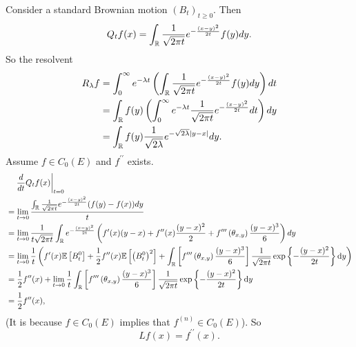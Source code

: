 \begin{exam}
    Consider a standard Brownian motion $(B_t)_{t \geq 0}$. Then
    \begin{equation*}
        Q_tf(x) = \int_{\mathbb{R}} \frac{1}{\sqrt{2\pi t}}e^{-\frac{(x-y)^2}{2t}}f(y)dy.
    \end{equation*}
    So the resolvent
    \begin{align*}
        R_\lambda f &= \int_0^\infty e^{-\lambda t} \left( \int_{\mathbb{R}} \frac{1}{\sqrt{2\pi t}}e^{-\frac{(x-y)^2}{2t}}f(y)dy \right)dt \\
        &= \int_{\mathbb{R}} f(y)\left(\int_0^\infty e^{-\lambda t} \frac{1}{\sqrt{2\pi t}}e^{-\frac{(x-y)^2}{2t}} dt \right) dy \\
        &= \int_{\mathbb{R}} f(y) \frac{1}{\sqrt{2 \lambda}} e^{-\sqrt{2\lambda} \left\lvert y-x\right\lvert} dy.
    \end{align*}
    Assume $f \in C_0(E)$ and $f^{\prime \prime}$ exists.
    \begin{align*}
        &\quad\left.\frac{d}{dt}Q_tf(x)\right\lvert_{t = 0} \\
        &= \lim_{t \rightarrow 0} \frac{ \int_{\mathbb{R}} \frac{1}{\sqrt{2\pi t}}e^{-\frac{(x-y)^2}{2t}}(f(y) - f(x))dy }{t} \\
        &= \lim_{t \rightarrow 0} \frac{1}{t\sqrt{2\pi t}}\int_{\mathbb{R}} e^{-\frac{(x-y)^2}{2t}}\left(f^{\prime}(x)(y-x)+f^{\prime \prime}(x) \frac{(y-x)^2}{2}+f^{\prime \prime \prime}\left(\theta_{x, y}\right) \frac{(y-x)^3}{6}\right)dy \\
        &= \lim_{t \rightarrow 0}\frac{1}{t}\left(f^{\prime}(x) \mathbb{E}\left[B_t^0\right]+\frac{1}{2} f^{\prime \prime}(x) \mathbb{E}\left[\left(B_t^0\right)^2\right]+\int_{\mathbb{R}}\left[f^{\prime \prime \prime}\left(\theta_{x, y}\right) \frac{(y-x)^3}{6}\right] \frac{1}{\sqrt{2 \pi t}} \exp \left\{-\frac{(y-x)^2}{2 t}\right\} \mathrm{d} y \right)\\
        &= \frac{1}{2} f^{\prime \prime}(x)+\lim_{t\rightarrow 0} \frac{1}{t}\int_{\mathbb{R}}\left[f^{\prime \prime \prime}\left(\theta_{x, y}\right) \frac{(y-x)^3}{6}\right] \frac{1}{\sqrt{2 \pi t}} \exp \left\{-\frac{(y-x)^2}{2 t}\right\} \mathrm{d} y \\
        &= \frac{1}{2} f^{\prime \prime}(x),
    \end{align*}
    (It is because $f \in C_0(E)$ implies that $f^{(n)} \in C_0(E)$). So
    \begin{equation*}
        Lf(x) = f^{\prime\prime}(x).
    \end{equation*}
\end{exam}

